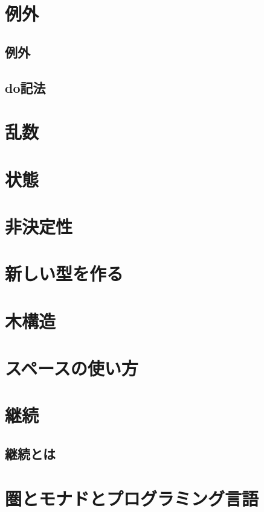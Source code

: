 \documentclass[twocolumn]{jsbook}
\begin{document}
\chapter{例外}

\section{例外}

\section{do記法}

\chapter{乱数}

\chapter{状態}

\chapter{非決定性}

\chapter{新しい型を作る}

\chapter{木構造}

\chapter{スペースの使い方}

\chapter{継続}

\section{継続とは}


\chapter{圏とモナドとプログラミング言語}
\end{document}
